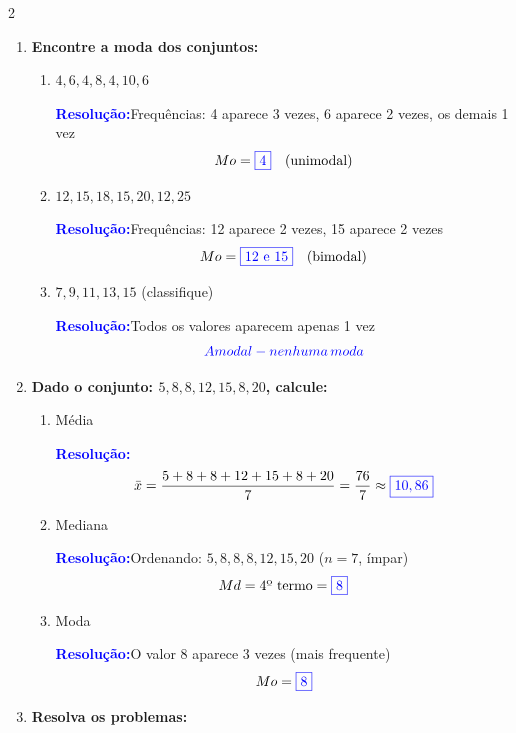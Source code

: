 \documentclass[11pt]{article}
\newcommand{\respostaNum}[1]{\textcolor{blue}{\boxed{#1}}}
\newcommand{\respostaTxt}[1]{\textcolor{blue}{#1}}
\newcommand{\resolucao}{\textbf{\textcolor{blue}{Resolução:}}}
\begin{document}
\begin{multicols}{2}
\begin{enumerate}[leftmargin=*]
\begin{enumerate}[label=\alph*)]
\resolucao Dados já ordenados ($n = 6$, par)
\[
Md = \frac{25 + 30}{2} = \frac{55}{2} = \respostaNum{27,5}
\]

\item $3, 7, 1, 9, 5, 8, 2$

\resolucao Ordenando: $1, 2, 3, 5, 7, 8, 9$ ($n = 7$, ímpar)
\[
Md = \text{4º termo} = \respostaNum{5}
\]
\end{enumerate}

\item \textbf{Encontre a moda dos conjuntos:}

\begin{enumerate}[label=\alph*)]
\item $4, 6, 4, 8, 4, 10, 6$

\resolucao Frequências: 4 aparece 3 vezes, 6 aparece 2 vezes, os demais 1 vez
\[
Mo = \respostaNum{4} \quad \text{(unimodal)}
\]

\item $12, 15, 18, 15, 20, 12, 25$

\resolucao Frequências: 12 aparece 2 vezes, 15 aparece 2 vezes
\[
Mo = \respostaNum{12 \text{ e } 15} \quad \text{(bimodal)}
\]

\item $7, 9, 11, 13, 15$ (classifique)

\resolucao Todos os valores aparecem apenas 1 vez
\[
\respostaTxt{Amodal - nenhuma \, moda}
\]
\end{enumerate}

\item \textbf{Dado o conjunto: $5, 8, 8, 12, 15, 8, 20$, calcule:}

\begin{enumerate}[label=\alph*)]
\item Média

\resolucao
\[
\bar{x} = \frac{5 + 8 + 8 + 12 + 15 + 8 + 20}{7} = \frac{76}{7} \approx \respostaNum{10,86}
\]

\item Mediana

\resolucao Ordenando: $5, 8, 8, 8, 12, 15, 20$ ($n = 7$, ímpar)
\[
Md = \text{4º termo} = \respostaNum{8}
\]

\item Moda

\resolucao O valor 8 aparece 3 vezes (mais frequente)
\[
Mo = \respostaNum{8}
\]
\end{enumerate}

\item \textbf{Resolva os problemas:}


\end{enumerate}
\end{multicols}
\end{document}
